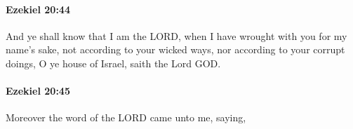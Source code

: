 		\paragraph{Ezekiel 20:44} %
			\label{EZEKIEL-20-44}

			And ye shall know that I am the LORD, when I have wrought with you for my name’s sake, not according to your wicked ways, nor according to your corrupt doings, O ye house of Israel, saith the Lord GOD.


		\paragraph{Ezekiel 20:45} %
			\label{EZEKIEL-20-45}

			Moreover the word of the LORD came unto me, saying,


